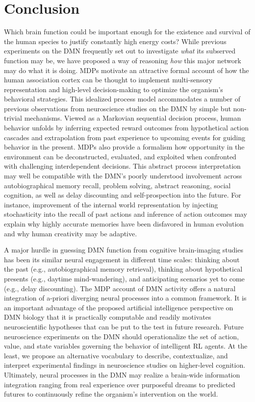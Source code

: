 \documentclass[10pt,letterpaper]{article}
\begin{document}
\section{Conclusion}
Which brain function could be important enough
for the existence and survival of the human species
to justify constantly high energy costs?
While previous experiments on the DMN frequently set out to investigate
\textit{what} its subserved function may be,
we have proposed a way of reasoning
\textit{how} this major network may do what it is doing.
%
MDPs motivate an attractive
formal account of how the human association cortex
can be thought to implement multi-sensory representation and high-level decision-making to
optimize the organism's behavioral strategies.
This idealized process model accommodates
a number of previous observations from neuroscience studies on the
DMN by simple but non-trivial mechanisms.
%
Viewed as a Markovian sequential decision process,
human behavior unfolds by inferring expected reward outcomes
from hypothetical action cascades
and extrapolation from past experience to
upcoming events for guiding behavior in the present.
MDPs also provide a formalism how
opportunity in the environment can be deconstructed, evaluated, and exploited
when confronted with challenging interdependent decisions.
%
This abstract process interpretation may well be compatible with the DMN's
poorly understood involvement across
autobiographical memory recall, problem solving,
abstract reasoning, social cognition,
as well as delay discounting and self-prospection into the future.
%
For instance, improvement of the internal world representation
by injecting stochasticity into the recall of past
actions and inference of action outcomes may explain why
highly accurate memories have been disfavored in human evolution
and why human creativity may be adaptive.




A major hurdle in guessing DMN function from cognitive brain-imaging studies has been its similar neural engagement in different time scales: thinking about the past (e.g., autobiographical memory retrieval), thinking about hypothetical presents (e.g., daytime mind-wandering), and
anticipating scenarios yet to come (e.g., delay discounting).
The MDP account of DMN activity offers a natural integration of a-priori diverging neural processes into a common framework.
%
It is an important advantage of the proposed artificial intelligence perspective
on DMN biology that it is practically computable and
readily motivates neuroscientific hypotheses that can be put to the test in future research.
%
Future neuroscience experiments on the DMN should operationalize
the set of action, value, and state variables governing
the behavior of intelligent RL agents.
%
At the least, we propose an alternative vocabulary to
describe, contextualize, and interpret experimental findings in neuroscience studies
on higher-level cognition.
%
Ultimately,
neural processes in the DMN may realize a brain-wide information integration
ranging from real experience over purposeful dreams to predicted futures
to continuously refine the organism's intervention on the world.
\end{document}

